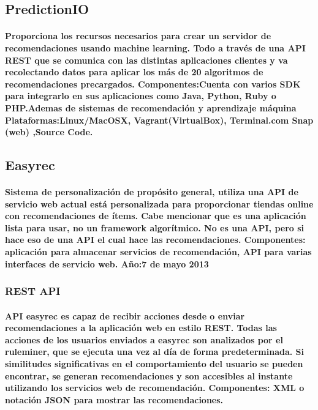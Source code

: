   \subsection{PredictionIO}
    \paragraph{Proporciona los recursos necesarios para crear un servidor de recomendaciones usando machine learning. Todo a través de una API REST que se comunica con las distintas aplicaciones clientes y va recolectando datos para aplicar los más de 20 algoritmos de recomendaciones precargados. Componentes:Cuenta con varios SDK para integrarlo en sus aplicaciones como Java, Python, Ruby o PHP.Ademas de sistemas de recomendación y aprendizaje máquina Plataformas:Linux/MacOSX, Vagrant(VirtualBox), Terminal.com Snap (web) ,Source Code.\cite{6}}

  \subsection{Easyrec}
    \paragraph{Sistema de personalización de propósito general, utiliza una API de servicio web actual está personalizada para proporcionar tiendas online con recomendaciones de ítems. Cabe mencionar que es una aplicación lista para usar, no un framework algorítmico. No es una API, pero si hace eso de una API el cual hace las recomendaciones. Componentes: aplicación para almacenar servicios de recomendación, API para varias interfaces de servicio web. Año:7 de mayo 2013\cite{7}}

    \subsubsection{REST API}
      \paragraph{API easyrec es capaz de recibir acciones desde o enviar recomendaciones a la aplicación web en estilo REST. Todas las acciones de los usuarios enviados a easyrec son analizados por el ruleminer, que se ejecuta una vez al día de forma predeterminada. Si similitudes significativas en el comportamiento del usuario se pueden encontrar, se generan recomendaciones y son accesibles al instante utilizando los servicios web de recomendación. Componentes: XML o notación JSON para mostrar las recomendaciones. \cite{8}}

